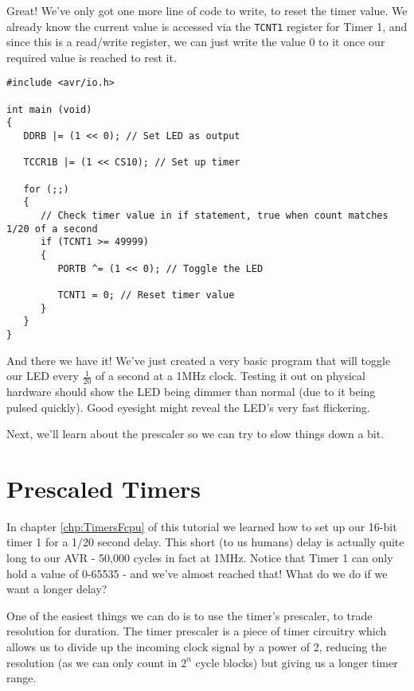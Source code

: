 \documentclass[a4paper,oneside]{book}
\begin{document}
Great! We've only got one more line of code to write, to reset the timer value. We already know the current value is accessed via the \texttt{TCNT1} register for Timer 1, and since this is a read/write register, we can just write the value 0 to it once our required value is reached to rest it.

\begin{center}
\begin{lstlisting}
#include <avr/io.h>

int main (void)
{
   DDRB |= (1 << 0); // Set LED as output

   TCCR1B |= (1 << CS10); // Set up timer

   for (;;)
   {
      // Check timer value in if statement, true when count matches 1/20 of a second
      if (TCNT1 >= 49999)
      {
         PORTB ^= (1 << 0); // Toggle the LED

         TCNT1 = 0; // Reset timer value
      }
   }
} 
\end{lstlisting}
\end{center}

And there we have it! We've just created a very basic program that will toggle our LED every \(\frac{1}{20}\) of a second at a 1MHz clock. Testing it out on physical hardware should show the LED being dimmer than normal (due to it being pulsed quickly). Good eyesight might reveal the LED's very fast flickering.

Next, we'll learn about the prescaler so we can try to slow things down a bit. 


\label{chp:PrescaledTimers}
\chapter{Prescaled Timers}

In chapter \ref{chp:TimersFcpu} of this tutorial we learned how to set up our 16-bit timer 1 for a 1/20 second delay. This short (to us humans) delay is actually quite long to our AVR - 50,000 cycles in fact at 1MHz. Notice that Timer 1 can only hold a value of 0-65535 - and we've almost reached that! What do we do if we want a longer delay?

One of the easiest things we can do is to use the timer's prescaler, to trade resolution for duration. The timer prescaler is a piece of timer circuitry which allows us to divide up the incoming clock signal by a power of 2, reducing the resolution (as we can only count in \(2^n\) cycle blocks) but giving us a longer timer range.
\end{document}

